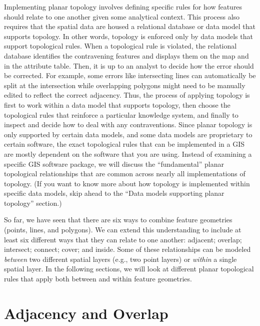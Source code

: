 \documentclass[
]{book}
\begin{document}
Implementing planar topology involves defining specific rules for how features should relate to one another given some analytical context. This process also requires that the spatial data are housed a relational database or data model that supports topology. In other words, topology is enforced only by data models that support topological rules. When a topological rule is violated, the relational database identifies the contravening features and displays them on the map and in the attribute table. Then, it is up to an analyst to decide how the error should be corrected. For example, some errors like intersecting lines can automatically be split at the intersection while overlapping polygons might need to be manually edited to reflect the correct adjacency. Thus, the process of applying topology is first to work within a data model that supports topology, then choose the topological rules that reinforce a particular knowledge system, and finally to inspect and decide how to deal with any contraventions. Since planar topology is only supported by certain data models, and some data models are proprietary to certain software, the exact topological rules that can be implemented in a GIS are mostly dependent on the software that you are using. Instead of examining a specific GIS software package, we will discuss the ``fundamental'' planar topological relationships that are common across nearly all implementations of topology. (If you want to know more about how topology is implemented within specific data models, skip ahead to the ``Data models supporting planar topology'' section.)

So far, we have seen that there are six ways to combine feature geometries (points, lines, and polygons). We can extend this understanding to include at least six different ways that they can relate to one another: adjacent; overlap; intersect; connect; cover; and inside. Some of these relationships can be modeled \emph{between} two different spatial layers (e.g., two point layers) or \emph{within} a single spatial layer. In the following sections, we will look at different planar topological rules that apply both between and within feature geometries.

\hypertarget{adjacency-and-overlap}{%
\section{Adjacency and Overlap}\label{adjacency-and-overlap}}
\end{document}
